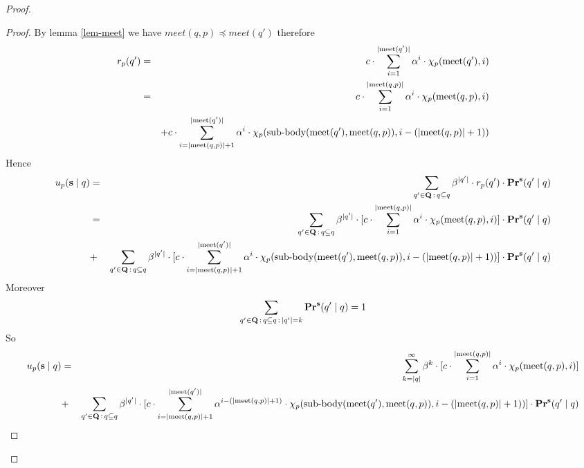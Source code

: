 \begin{proof}
\begin{proof}
	By lemma \ref{lem-meet} we have $meet(q,p) \preceq meet(q')$ therefore
	\begin{eqnarray*}
		r_p(q') & = &{\displaystyle c \cdot \sum_{i=1}^{|\text{\rm meet}(q')|} \alpha^i \cdot \chi_p(\text{\rm meet}(q'),i)} \\
		& = & {\displaystyle c \cdot \sum_{i=1}^{|\text{\rm meet}(q,p)|} \alpha^i \cdot \chi_p(\text{\rm meet}(q,p),i) } \\
		&&	+ {\displaystyle c \cdot \sum_{i=|\text{\rm meet}(q,p)|+1}^{|\text{\rm meet}(q')|} \alpha^{i} \cdot \chi_p({\text{\rm sub-body}}(\text{\rm meet}(q'),\text{\rm meet}(q,p)),i-(|\text{\rm meet}(q,p)|+1))  }   \\
	\end{eqnarray*}
Hence 
	\begin{eqnarray*}
		u_p(\mathbf{s} \mid q)& = & \sum_{q' \in \mathbf{Q} \,:\, q \subseteq q} \beta^{|q'|} \cdot  r_p(q') \cdot \mathbf{Pr}^{\mathbf{s}}(q' \mid q) \\ 
		& = & \sum_{q' \in \mathbf{Q} \,:\, q \subseteq q} \beta^{|q'|} \cdot  [{\displaystyle c \cdot \sum_{i=1}^{|\text{\rm meet}(q,p)|} \alpha^i \cdot \chi_p(\text{\rm meet}(q,p),i) }] \cdot \mathbf{Pr}^{\mathbf{s}}(q' \mid q) \\
		&+ & \sum_{q' \in \mathbf{Q} \,:\, q \subseteq q} \beta^{|q'|} \cdot  [{\displaystyle c \cdot \sum_{i=|\text{\rm meet}(q,p)|+1}^{|\text{\rm meet}(q')|} \alpha^{i} \cdot \chi_p({\text{\rm sub-body}}(\text{\rm meet}(q'),\text{\rm meet}(q,p)),i-(|\text{\rm meet}(q,p)|+1))  }] \cdot \mathbf{Pr}^{\mathbf{s}}(q' \mid q) \\
	\end{eqnarray*}
Moreover $$ \sum_{q' \in \mathbf{Q} \,:\, q \subseteq q \,:\, |q'| =k}  \mathbf{Pr}^{\mathbf{s}}(q' \mid q) = 1$$
So 
	\begin{eqnarray*}
		u_p(\mathbf{s} \mid q) & = & \sum_{k = |q|}^{\infty} \beta^{k} \cdot  [{\displaystyle c \cdot \sum_{i=1}^{|\text{\rm meet}(q,p)|} \alpha^i \cdot \chi_p(\text{\rm meet}(q,p),i) }] \\
		&+ & \sum_{q' \in \mathbf{Q} \,:\, q \subseteq q} \beta^{|q'|} \cdot  [{\displaystyle c \cdot \sum_{i=|\text{\rm meet}(q,p)|+1}^{|\text{\rm meet}(q')|} \alpha^{i-(|\text{\rm meet}(q,p)|+1)} \cdot \chi_p({\text{\rm sub-body}}(\text{\rm meet}(q'),\text{\rm meet}(q,p)),i-(|\text{\rm meet}(q,p)|+1))  }] \cdot \mathbf{Pr}^{\mathbf{s}}(q' \mid q) \\
	\end{eqnarray*}


\end{proof}
\end{proof}
